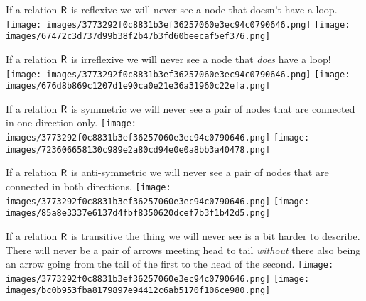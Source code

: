 \documentclass[10pt,]{book}
\theoremstyle{plain}
\theoremstyle{definition}
\theoremstyle{definition}
\numberwithin{equation}{section}
\newcommand{\relR}{\mbox{\textsf R}}
\begin{document}
    If a relation \(\relR\) is reflexive we will never see a node that doesn't have a loop.
\texttt{[image: images/3773292f0c8831b3ef36257060e3ec94c0790646.png]}
\texttt{[image: images/67472c3d737d99b38f2b47b3fd60beecaf5ef376.png]}
\par

    If a relation \(\relR\) is irreflexive we will never see a node that \emph{does} have a loop!
\texttt{[image: images/3773292f0c8831b3ef36257060e3ec94c0790646.png]}
\texttt{[image: images/676d8b869c1207d1e90ca0e21e36a31960c22efa.png]}
\par

    If a relation \(\relR\) is symmetric we will never see a pair of nodes that are connected in one
    direction only.
\texttt{[image: images/3773292f0c8831b3ef36257060e3ec94c0790646.png]}
\texttt{[image: images/723606658130c989e2a80cd94e0e0a8bb3a40478.png]}
\par

    If a relation \(\relR\) is anti-symmetric we will never see a pair of nodes that are connected in both
    directions.
\texttt{[image: images/3773292f0c8831b3ef36257060e3ec94c0790646.png]}
\texttt{[image: images/85a8e3337e6137d4fbf8350620dcef7b3f1b42d5.png]}
\par

    If a relation \(\relR\) is transitive the thing we will never see is a bit harder to describe.
    There will never be a pair of arrows meeting head to tail \emph{without} there also being an
    arrow going from the tail of the first to the head of the second.
\texttt{[image: images/3773292f0c8831b3ef36257060e3ec94c0790646.png]}
\texttt{[image: images/bc0b953fba8179897e94412c6ab5170f106ce980.png]}
\typeout{************************************************}
\typeout{************************************************}
\end{document}
